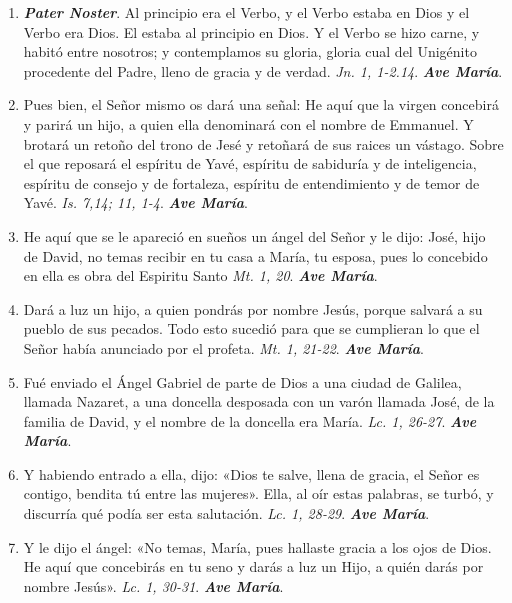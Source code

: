 \documentclass[../../devocionario.tex]{subfiles}
\begin{document}
    \begin{enumerate}

        \item \textbf{\emph{Pater Noster}}. Al principio era el Verbo, y el Verbo estaba en Dios y el Verbo era Dios. El estaba al principio en Dios. Y el Verbo se hizo carne, 
                y habitó entre nosotros; y contemplamos su gloria, gloria cual del Unigénito procedente del Padre, lleno de gracia y de verdad. 
                \emph{Jn. 1, 1-2.14}. \textbf{\emph{Ave María}}.

        \item Pues bien, el Señor mismo os dará una señal: He aquí que la virgen concebirá y parirá un hijo, 
                a quien ella denominará con el nombre de Emmanuel. Y brotará un retoño del trono de Jesé y retoñará de sus raices un vástago. 
                Sobre el que reposará el espíritu de Yavé, espíritu de sabiduría y de inteligencia, espíritu de consejo y de fortaleza, espíritu 
                de entendimiento y de temor de Yavé. \emph{Is. 7,14; 11, 1-4}. \textbf{\emph{Ave María}}.                

        \item He aquí que se le apareció en sueños un ángel del Señor y le dijo: José, hijo de David, no temas recibir en tu casa a María, tu esposa,
                pues lo concebido en ella es obra del Espiritu Santo \emph{Mt. 1, 20}. \textbf{\emph{Ave María}}.

        \item Dará a luz un hijo, a quien pondrás por nombre Jesús, porque salvará a su pueblo de sus pecados. Todo esto sucedió para que se cumplieran
                lo que el Señor había anunciado por el profeta. \emph{Mt. 1, 21-22}. \textbf{\emph{Ave María}}.
    
        \item Fué enviado el Ángel Gabriel de parte de Dios a una ciudad de Galilea, llamada Nazaret, 
                a una doncella desposada con un varón llamada José, de la familia de David, y el nombre de la doncella era María. \emph{Lc. 1, 26-27}. \textbf{\emph{Ave María}}.

        \item Y habiendo entrado a ella, dijo: «Dios te salve, llena de gracia, el Señor es contigo, bendita tú entre las mujeres». 
                Ella, al oír estas palabras, se turbó, y discurría qué podía ser esta salutación. \emph{Lc. 1, 28-29}. \textbf{\emph{Ave María}}.

        \item Y le dijo el ángel: «No temas, María, pues hallaste gracia a los ojos de Dios. He aquí que concebirás en tu seno y darás a luz un Hijo, 
                a quién darás por nombre Jesús». \emph{Lc. 1, 30-31}. \textbf{\emph{Ave María}}.


\end{enumerate}
\end{document}
